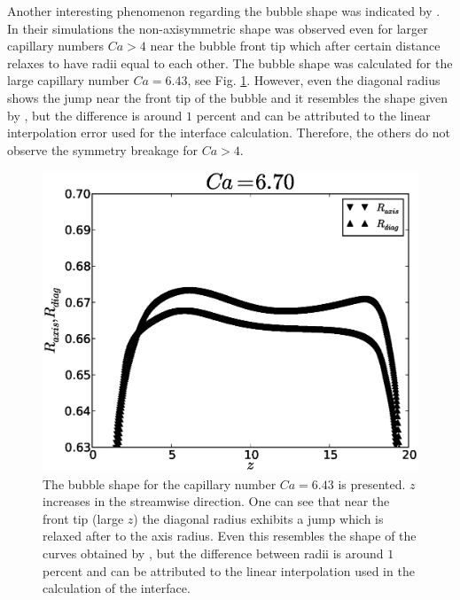 \documentclass{article}
\begin{document}
Another interesting phenomenon regarding the bubble shape was indicated by \citet{heil-threedim}. In
their simulations the non-axisymmetric shape was observed even for larger capillary numbers $Ca>4$
near
the bubble front tip which after certain distance relaxes to have radii equal to each other. The
bubble shape was calculated for the large capillary number $Ca=6.43$, see Fig.
\ref{fig:bubble:ca:large}. However, even the diagonal radius shows the jump near the front tip of
the bubble and it resembles the shape given by \citet{heil-threedim}, but the difference is around
$1$ percent and can be attributed to the linear interpolation error used for the interface
calculation. Therefore, the others do not observe the symmetry breakage for $Ca>4$. 
\begin{figure}[ht]
\includegraphics[width=\textwidth]{Figures/bubble_ca_large.eps}
\caption{The bubble shape for the capillary number $Ca=6.43$ is presented. $z$ increases in the
streamwise direction. One can see that near the front tip (large $z$) the diagonal radius exhibits
a jump which is relaxed after to the axis radius. Even this resembles
the shape of the curves obtained by \citet{heil-threedim}, but the
difference between radii is around $1$ percent and can be attributed to
the linear interpolation used in the calculation of the interface.\label{fig:bubble:ca:large}}
\end{figure}
\end{document}

